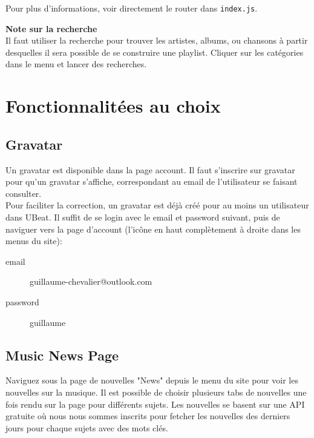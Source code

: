 \documentclass[12pt]{/home/samuel/Documents/GLO/latex/documentClass/GLO_ULAVAL}
\begin{document}
Pour plus d'informations, voir directement le router dans \texttt{index.js}.

\begin{center}
  \begin{minipage}{0.8\linewidth}
    \textbf{Note sur la recherche} \\[10pt]
      Il faut utiliser la recherche pour trouver les artistes, albums, ou chansons à partir desquelles il sera possible de se construire une playlist. Cliquer sur les catégories dans le menu et lancer des recherches.
  \end{minipage}
\end{center}

\chapter*{Fonctionnalitées au choix}
\section*{Gravatar}
Un gravatar est disponible dans la page account. Il faut s'inscrire sur gravatar pour qu'un gravatar s'affiche, correspondant au email de l'utilisateur se faisant consulter. \\
Pour faciliter la correction, un gravatar est déjà créé pour au moins un utilisateur dans UBeat. Il suffit de se login avec le email et password suivant, puis de naviguer vers la page d'account (l'icône en haut complètement à droite dans les menus du site): \\
\begin{center}
  \begin{minipage}{0.5\linewidth}
    \centering
    \begin{description}
      \item[email] guillaume-chevalier@outlook.com
      \item[password] guillaume
    \end{description}
  \end{minipage}
\end{center}

\section*{Music News Page}
Naviguez sous la page de nouvelles "News" depuis le menu du site pour voir les nouvelles sur la musique. Il est possible de choisir plusieurs tabs de nouvelles une fois rendu sur la page pour différents sujets. Les nouvelles se basent sur une API gratuite où nous nous sommes inscrits pour fetcher les nouvelles des derniers jours pour chaque sujets avec des mots clés.
\end{document}
